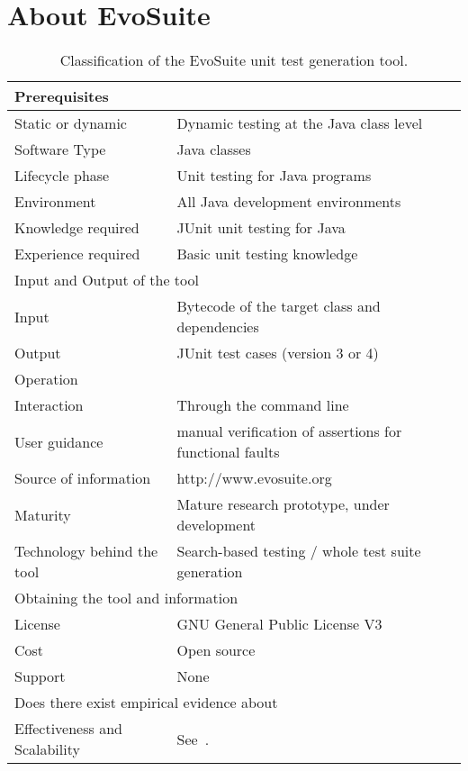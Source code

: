 \documentclass[10pt,conference,compsocconf]{IEEEtran}
\newcommand{\EVOSUITE}{{\sc EvoSuite}\xspace}
\begin{document}
\section{About \EVOSUITE}


\begin{table}[!h]
\renewcommand{\arraystretch}{1.3}
\caption{Classification of the \EVOSUITE unit test generation tool.}\label{tool-description}
\begin{tabular}{|l|p{5cm}|}
  \hline
  \multicolumn{2}{|l|}{Prerequisites} \\
  \hline
  Static or dynamic &  Dynamic testing at the Java class level\\
  Software Type &  Java classes\\
  Lifecycle phase&  Unit testing for Java programs\\
  Environment&  All Java development environments \\
  Knowledge required & JUnit unit testing for Java\\
  Experience required &  Basic unit testing knowledge\\
 \hline
  \multicolumn{2}{|l|}{Input and Output of the tool} \\
  \hline
 Input & Bytecode of the target class and dependencies \\
\hline
Output&  JUnit test cases (version 3 or 4)\\
 
  \hline
  \multicolumn{2}{|l|}{Operation} \\
  \hline
  Interaction &  Through the command line\\
  User guidance &  manual verification of assertions for functional faults\\
  Source of information &  http://www.evosuite.org \\
  Maturity&  Mature research prototype, under development\\
  Technology behind the tool & Search-based testing / whole test suite generation\\
\hline
  \multicolumn{2}{|l|}{Obtaining the tool and information} \\
  \hline
License & GNU General Public License V3\\
Cost & Open source\\
Support & None \\
\hline
\hline
  \multicolumn{2}{|l|}{Does there exist empirical evidence about} \\
  \hline
  Effectiveness and Scalability & See~\cite{GoA_TSE12,FrA12b}. \\
\hline
\end{tabular}\vspace{-1em}
\end{table}
\end{document}
